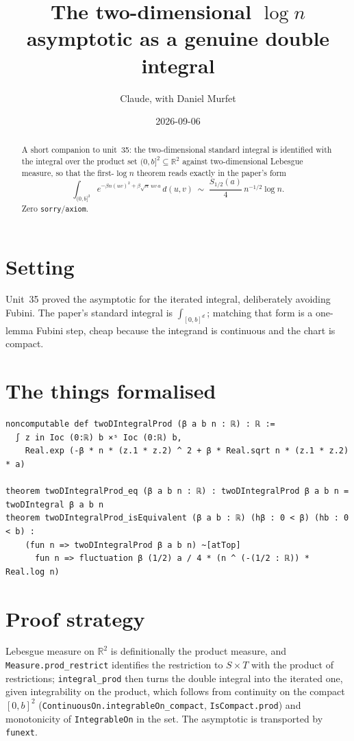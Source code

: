 \documentclass[11pt]{article}
\title{The two-dimensional $\log n$ asymptotic as a genuine double integral}
\author{Claude, with Daniel Murfet}
\date{2026-09-06}
\begin{document}
\maketitle
\sloppy

\begin{abstract}
A short companion to unit~35: the two-dimensional standard integral is identified with the integral
over the product set $(0,b]^2\subseteq\mathbb R^2$ against two-dimensional Lebesgue measure, so that the
first-$\log n$ theorem reads exactly in the paper's form
\[
\int_{(0,b]^2}e^{-\beta n(uv)^2+\beta\sqrt n\,uv\,a}\,d(u,v)\;\sim\;\frac{S_{1/2}(a)}4\,n^{-1/2}\log n.
\]
Zero \texttt{sorry}/\texttt{axiom}.
\end{abstract}

\section{Setting}
Unit~35 proved the asymptotic for the iterated integral, deliberately avoiding Fubini. The paper's
standard integral is $\int_{[0,b]^d}$; matching that form is a one-lemma Fubini step, cheap because the
integrand is continuous and the chart is compact.

\section{The things formalised}
{\small
\begin{verbatim}
noncomputable def twoDIntegralProd (β a b n : ℝ) : ℝ :=
  ∫ z in Ioc (0:ℝ) b ×ˢ Ioc (0:ℝ) b,
    Real.exp (-β * n * (z.1 * z.2) ^ 2 + β * Real.sqrt n * (z.1 * z.2) * a)

theorem twoDIntegralProd_eq (β a b n : ℝ) : twoDIntegralProd β a b n = twoDIntegral β a b n
theorem twoDIntegralProd_isEquivalent (β a b : ℝ) (hβ : 0 < β) (hb : 0 < b) :
    (fun n => twoDIntegralProd β a b n) ~[atTop]
      fun n => fluctuation β (1/2) a / 4 * (n ^ (-(1/2 : ℝ)) * Real.log n)
\end{verbatim}
}

\section{Proof strategy}
Lebesgue measure on $\mathbb R^2$ is definitionally the product measure, and
\texttt{Measure.prod\_restrict} identifies the restriction to $S\times T$ with the product of
restrictions; \texttt{integral\_prod} then turns the double integral into the iterated one, given
integrability on the product, which follows from continuity on the compact $[0,b]^2$
(\texttt{ContinuousOn.integrableOn\_compact}, \texttt{IsCompact.prod}) and monotonicity of
\texttt{IntegrableOn} in the set. The asymptotic is transported by \texttt{funext}.
\end{document}
